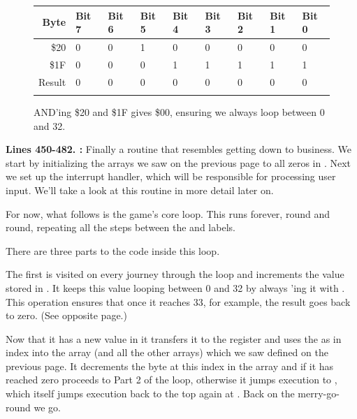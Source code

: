 \begin{figure}[H]
  {
    \setlength{\tabcolsep}{3.0pt}
    \setlength\cmidrulewidth{\heavyrulewidth} %
    \begin{adjustbox}{width=7cm,center}

      \begin{tabular}{rllllllll}
        \toprule
        Byte & Bit 7 & Bit 6 & Bit 5 & Bit 4 & Bit 3 & Bit 2 & Bit 1 & Bit 0        \\
        \midrule
        \$20 & 0 & 0 & 1 & 0 & 0 & 0 & 0 & 0 \\
        \$1F & 0 & 0 & 0 & 1 & 1 & 1 & 1 & 1 \\
        \midrule
        Result & 0 & 0 & 0 & 0 & 0 & 0 & 0 & 0 \\
        \addlinespace
        \bottomrule
      \end{tabular}
    \end{adjustbox}
    }\caption*{AND'ing \$20 and \$1F gives \$00, ensuring we always loop between 0 and 32.}
\end{figure}
\clearpage
\textbf{Lines 450-482. :} Finally a routine that resembles getting down to business. We start by initializing the arrays we saw on the 
previous page to all zeros in . Next we set up the interrupt handler, which will
be responsible for processing user input. We'll take a look at this routine in more detail later on.

For now, what follows is the game's core loop. This runs forever, round and round, repeating all the steps between the
 and  labels. 

There are three parts to the code inside this loop. 

The first is visited on every journey through the loop and increments the
value stored in . It keeps this value looping between 0 and 32 by always 'ing
it with . This  operation ensures that once it reaches 33, for example, the result
goes back to zero. (See opposite page.)

Now that it has a new value in  it transfers it to the  register and uses the 
 as in index into the  array (and all the other arrays) which we saw defined on the previous 
page. It decrements the byte at this index in the  array and if it has reached zero
proceeds to Part 2 of the loop, otherwise it jumps execution to , which itself jumps execution
back to the top again at . Back on the merry-go-round we go.

